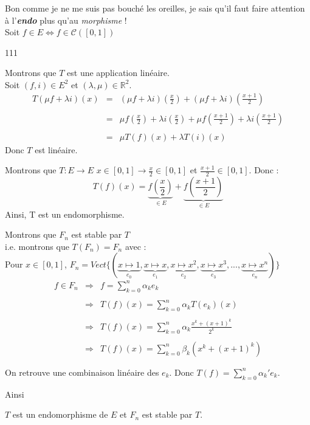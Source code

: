 Bon comme je ne me suis pas bouché les oreilles, je sais qu'il faut faire attention à l'\textit{\textbf{endo}} plus qu'au \textit{morphisme} !\\

Soit $f\in E \iff f\in\mathcal{C}([0, 1])$
\begin{dinglist}{111}
  \item Montrons que $T$ est une application linéaire.\\
  Soit $(f, i) \in E^2$ et $(\lambda, \mu) \in \mathbb{R}^2$.
  \[
    \begin{array}{rcl}
      T(\mu f+\lambda i)(x) & = & (\mu f+\lambda i)\left(\frac{x}{2}\right) + (\mu f+\lambda i)\left(\frac{x+1}{2}\right)                                                   \\\\
                            & = & \mu f \left(\frac{x}{2}\right) + \lambda i \left(\frac{x}{2}\right) + \mu f\left(\frac{x+1}{2}\right)+\lambda i\left(\frac{x+1}{2}\right) \\\\
                            & = & \mu T(f)(x) + \lambda T(i)(x)
    \end{array}
  \]
  Donc $T$ est linéaire.
  \item Montrons que $T : E\rightarrow E$
  $x\in [0, 1] \rightarrow \frac{x}{2}\in [0, 1]$ et $\frac{x+1}{2}\in [0, 1]$. Donc :
  \[
    T(f)(x) = \underbrace{f\left(\frac{x}{2}\right)}_{\in E} + \underbrace{f\left(\frac{x+1}{2}\right)}_{\in E}
  \]
  Ainsi, T est un endomorphisme.
  \item Montrons que $F_n$ est stable par $T$
  \\i.e. montrons que $T(F_n) = F_n$ avec :\\
  Pour $x\in [0, 1]$, $F_n = Vect\{(\underbrace{x\mapsto 1}_{e_0}, \underbrace{x\mapsto x}_{e_1}, \underbrace{x\mapsto x^2}_{e_2}, \underbrace{x\mapsto x^3}_{e_3}, ..., \underbrace{x\mapsto x^n}_{e_n})\}$\\
  \[
    \begin{array}{rcl}
      f\in F_n & \Rightarrow & f = \sum\limits_{k=0}^{n}\alpha_k e_k                              \\ \\
               & \Rightarrow & T(f)(x) = \sum\limits_{k=0}^{n}\alpha_k T(e_k)(x)                  \\ \\
               & \Rightarrow & T(f)(x) = \sum\limits_{k=0}^{n}\alpha_k \frac{x^k + (x+1)^k }{2^k} \\ \\
               & \Rightarrow & T(f)(x) = \sum\limits_{k=0}^{n}\beta_k \left(x^k + (x+1)^k\right)  \\ \\
    \end{array}
  \]
  On retrouve une combinaison linéaire des $e_k$. Donc $T(f) = \sum\limits_{k=0}^{n}\alpha_k' e_k$.
\end{dinglist}

Ainsi
\begin{result}
  $T$ est un endomorphisme de $E$ et $F_n$ est stable par $T$.
\end{result}

